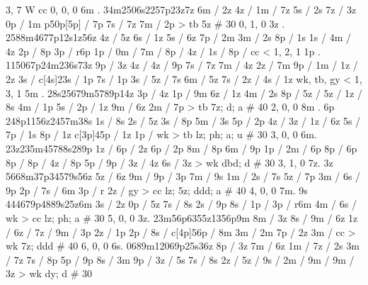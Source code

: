3, 7
W
cc
0, 0, 0
6m . 
34m2506s2257p23z7z 
6m / 2z 
4z / 
1m / 7z 
5s / 2s 
7z / 3z 
0p / 1m 
p50p[5p] / 7p 
7s / 7z 
7m / 2p 
> tb 
5z # 30 
%
0, 1, 0 
3z . 
2588m4677p12s1z56z 
4z / 5z 
6s / 1z 
5s / 6z 
7p / 2m 
3m / 2s 
8p / 1s 
1s / 
4m / 4z 
2p / 8p 
3p / r6p 
1p / 
0m / 
7m / 
8p / 
4z / 
1s / 
8p / 
cc < 
%
1, 2, 1 
1p . 
115067p24m236s73z 
9p / 3z 
4z / 
4z / 9p
7s / 7z 
7m / 4z 
2z / 7m 
9p / 
1m / 
1z / 2z 
3s / 
c[4s]23s / 1p 
7s / 1p 
3s / 
5z / 7s 
6m / 5z 
7s / 
2z / 
4s / 1z 
wk, tb, gy < 
%
1, 3, 1
5m . 
28s25679m5789p14z 
3p / 4z 
1p / 9m 
6z / 1z 
4m / 2s 
8p / 
5z / 
5z / 
1z / 8s 
4m / 1p 
5s / 
2p / 1z 
9m / 6z 
2m / 7p
> tb 
7z; d; a # 40
%
2, 0, 0
8m . 6p
248p1156z2457m38s 
1s / 8s 
2s / 5z 
3s / 8p 
5m / 3s 
5p / 2p 
4z / 
3z / 
1z / 6z 
5s / 
7p / 1s 
8p / 1z 
c[3p]45p / 1z 
1p / 
wk > tb 
lz; ph; a; u # 30 
% 
3, 0, 0
6m. 
23z235m45788s289p 
1z / 
6p / 2z 
6p / 2p 
8m / 8p 
6m / 9p 
1p / 
2m / 6p 
8p / 6p 
8p / 
8p / 
4z / 8p 
5p /  
9p / 
3z / 4z 
6s / 3z 
> wk 
dbd; d # 30
%
3, 1, 0
7z. 3z
5668m37p34579s56z 
5z / 6z 
9m / 
9p / 3p 
7m / 9s 
1m / 
2s / 7s 
5z / 7p 
3m / 
6s / 9p 
2p / 
7s / 6m 
3p / r 
2z / 
gy > cc 
lz; 5z; ddd; a # 40
%
4, 0, 0
7m. 9s
444679p4889s25z6m 
3s / 2z 
0p / 5z 
7s / 8s 
2s / 9p 
8s / 
1p / 
3p / r6m 
4m / 
6s / 
wk > cc 
lz; ph; a # 30
%
5, 0, 0 
3z.
23m56p6355z1356p9m 
8m / 3z 
8s /
9m / 6z 
1z / 
6z / 
7z / 
9m / 3p 
2z / 1p 
2p /
8s /
c[4p]56p / 8m 
3m / 2m 
7p / 2z 
3m / 
cc > wk 
7z; ddd # 40 
% 
6, 0, 0 
6s. 
0689m12069p25s36z 
8p / 3z 
7m / 6z 
1m / 
7z / 2s
3m / 7z 
7s / 8p 
5p / 9p 
8s / 3m 
9p / 
3z / 5s 
7s / 8s 
2z / 
5z / 
9s / 
2m / 
9m / 
9m / 3z 
> wk 
dy; d # 30

